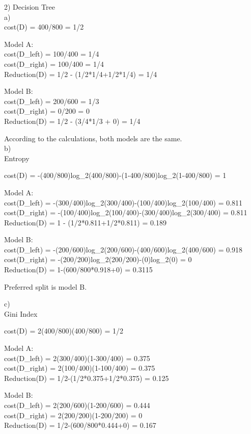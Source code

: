 \documentclass[11pt]{article}
\begin{document}
2) Decision Tree \\
a) \\
cost(D) = 400/800 = 1/2

Model A: \\
cost(D\_left) = 100/400 = 1/4 \\
cost(D\_right) = 100/400 = 1/4 \\
Reduction(D) = 1/2 - (1/2*1/4+1/2*1/4) = 1/4

Model B: \\ 
cost(D\_left) = 200/600 = 1/3 \\
cost(D\_right) =  0/200 = 0 \\
Reduction(D) = 1/2 - (3/4*1/3 + 0) = 1/4 

According to the calculations, both models are the same. \\

b)  \\
Entropy 

cost(D) = -(400/800)log\_2(400/800)-(1-400/800)log\_2(1-400/800) = 1

Model A: \\
cost(D\_left) =  -(300/400)log\_2(300/400)-(100/400)log\_2(100/400) = 0.811 \\
cost(D\_right) =  -(100/400)log\_2(100/400)-(300/400)log\_2(300/400) = 0.811 \\
Reduction(D) = 1 - (1/2*0.811+1/2*0.811) = 0.189 

Model B: \\ 
cost(D\_left) = -(200/600)log\_2(200/600)-(400/600)log\_2(400/600) = 0.918 \\
cost(D\_right) = -(200/200)log\_2(200/200)-(0)log\_2(0) = 0\\
Reduction(D) = 1-(600/800*0.918+0) = 0.3115 

Preferred split is model B.

c) \\
Gini Index 

cost(D) = 2(400/800)(400/800) = 1/2

Model A: \\
cost(D\_left) =  2(300/400)(1-300/400) = 0.375\\
cost(D\_right) =  2(100/400)(1-100/400) = 0.375\\
Reduction(D) = 1/2-(1/2*0.375+1/2*0.375) = 0.125

Model B: \\ 
cost(D\_left) = 2(200/600)(1-200/600) = 0.444\\
cost(D\_right) = 2(200/200)(1-200/200) = 0\\
Reduction(D) = 1/2-(600/800*0.444+0) = 0.167
\end{document}
